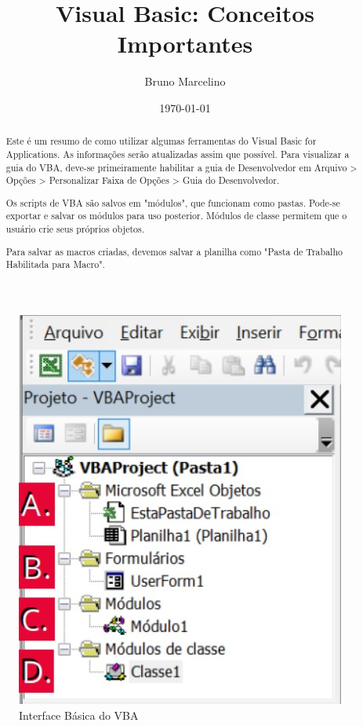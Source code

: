\documentclass[12pt, a4paper]{article}
\title{Visual Basic: Conceitos Importantes}
\author{Bruno Marcelino}
\date{\today}
\begin{document}
\maketitle

\begin{abstract}
    Este é um resumo de como utilizar algumas ferramentas do Visual Basic for Applications. As informações serão atualizadas assim que possível. Para visualizar a guia do VBA, deve-se primeiramente habilitar a guia de Desenvolvedor em Arquivo > Opções > Personalizar Faixa de Opções > Guia do Desenvolvedor.

    Os scripts de VBA são salvos em "módulos", que funcionam como pastas. Pode-se exportar e salvar os módulos para uso posterior. Módulos de classe permitem que o usuário crie seus próprios objetos. 

    Para salvar as macros criadas, devemos salvar a planilha como "Pasta de Trabalho Habilitada para Macro". 
\end{abstract}

\begin{figure}[h]
    \centering
    \includegraphics[scale = 0.75]{Screenshot_1.jpg}
    \caption{Interface Básica do VBA}
\end{figure}
\end{document}
